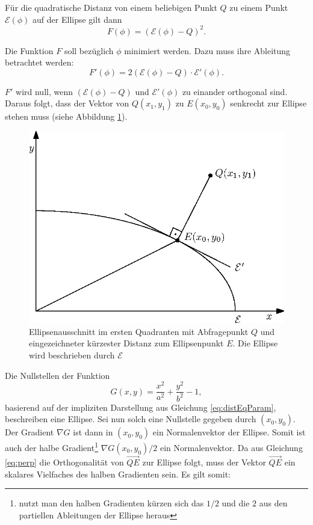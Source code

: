 Für die quadratische Distanz von einem beliebigen Punkt $Q$ zu einem Punkt $\mathcal{E}(\phi)$ auf der Ellipse gilt dann
\begin{equation}
	F(\phi) = \left(\mathcal{E}(\phi) - Q\right)^2.
\end{equation}

Die Funktion $F$ soll bezüglich $\phi$ minimiert werden. Dazu muss ihre Ableitung betrachtet werden:
\begin{equation}\label{eq:perp}
F'(\phi) = 2\left(\mathcal{E}(\phi) - Q\right) \cdot \mathcal{E}'(\phi).
\end{equation}

$F'$ wird null, wenn $\left(\mathcal{E}(\phi) - Q\right)$ und $ \mathcal{E}'(\phi)$ zu einander orthogonal sind. Daraus folgt, dass der Vektor von $Q(x_1,y_1)$ zu $E(x_0,y_0)$ senkrecht zur Ellipse stehen muss (siehe Abbildung \ref{fig:ellipseDist}).


\begin{figure}[!htb]
	\centering
	\includegraphics[scale=.9]{images/ellipseQuery.eps}
	\caption[Ellipsenausschnitt im ersten Quadranten mit Abfragepunkt $Q$ und eingezeichneter kürzester Distanz zum Ellipsenpunkt $E$]{Ellipsenausschnitt im ersten Quadranten mit Abfragepunkt $Q$ und eingezeichneter kürzester Distanz zum Ellipsenpunkt $E$. Die Ellipse wird beschrieben durch $\mathcal{E}$}
	\label{fig:ellipseDist}
\end{figure}

Die Nullstellen der Funktion
\begin{equation} \label{eq:ellipseDistEq}
	G(x,y) = \frac{x^2}{a^2} + \frac{y^2}{b^2} - 1,
\end{equation}
basierend auf der impliziten Darstellung aus Gleichung \ref{eq:distEqParam},
beschreiben eine Ellipse. Sei nun solch eine Nullstelle gegeben durch $(x_0,y_0)$. Der Gradient $\nabla G$ ist dann in $(x_0,y_0)$ ein Normalenvektor der Ellipse. Somit ist auch der halbe Gradient\footnote{nutzt man den halben Gradienten kürzen sich das $1/2$ und die $2$ aus den partiellen Ableitungen der Ellipse heraus} $\nabla G(x_0,y_0)/2$ ein Normalenvektor. Da aus Gleichung \ref{eq:perp} die Orthogonalität von $\overrightarrow{QE}$ zur Ellipse folgt,  muss der Vektor  $\overrightarrow{QE}$ ein skalares Vielfaches des halben Gradienten sein. Es gilt somit:


